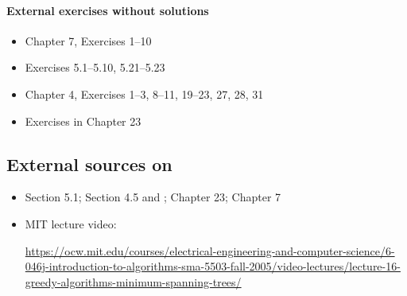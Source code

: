 \paragraph{External exercises without solutions}
\begin{itemize}
\item \JE Chapter 7, Exercises 1--10 
\item \DPV Exercises  5.1--5.10, 5.21--5.23
\item \KT Chapter 4, Exercises 1--3, 8--11, 19--23, 27, 28, 31
\item \CLRS Exercises in Chapter 23
\end{itemize}


\subsection{External sources on }

\begin{itemize}

\item \DPV Section 5.1;
  \KT Section 4.5 and \KWSlides;
  \CLRS Chapter 23;
  \JE Chapter 7

\item MIT lecture video: 

  \parbox{5in}{  
\url{https://ocw.mit.edu/courses/electrical-engineering-and-computer-science/6-046j-introduction-to-algorithms-sma-5503-fall-2005/video-lectures/lecture-16-greedy-algorithms-minimum-spanning-trees/}}

\end{itemize}


